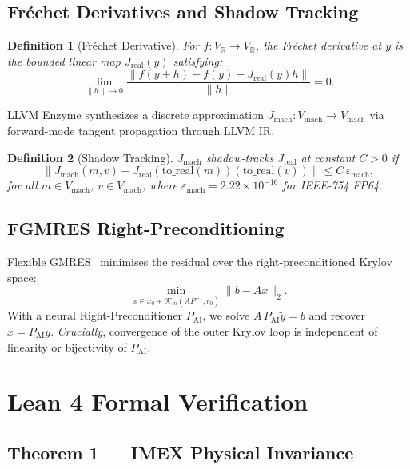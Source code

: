 \documentclass[11pt,twocolumn]{article}
\newtheorem{definition}{Definition}[section]
\begin{document}
\subsection{Fréchet Derivatives and Shadow Tracking}

\begin{definition}[Fréchet Derivative]
For $f: V_{\mathbb{R}} \to V_{\mathbb{R}}$, the Fréchet derivative at
$y$ is the bounded linear map $J_{\mathrm{real}}(y)$ satisfying:
\[
  \lim_{\|h\|\to 0}
  \frac{\|f(y+h)-f(y)-J_{\mathrm{real}}(y)h\|}{\|h\|} = 0.
\]
\end{definition}

LLVM Enzyme synthesizes a discrete approximation
$J_{\mathrm{mach}}: V_{\mathrm{mach}}\to V_{\mathrm{mach}}$
via forward-mode tangent propagation through LLVM IR.

\begin{definition}[Shadow Tracking]
$J_{\mathrm{mach}}$ \emph{shadow-tracks} $J_{\mathrm{real}}$ at constant
$C > 0$ if
\[
  \|J_{\mathrm{mach}}(m,v)
    - J_{\mathrm{real}}(\mathrm{to\_real}(m))(\mathrm{to\_real}(v))\|
  \leq C\,\varepsilon_{\mathrm{mach}},
\]
for all $m \in V_{\mathrm{mach}}$, $v \in V_{\mathrm{mach}}$, where
$\varepsilon_{\mathrm{mach}} = 2.22\times10^{-16}$ for IEEE-754 FP64.
\end{definition}

\subsection{FGMRES Right-Preconditioning}

Flexible GMRES~\cite{saad1993} minimises the residual over the
right-preconditioned Krylov space:
\[
  \min_{x \in x_0+\mathcal{K}_m(AP^{-1},r_0)} \|b - Ax\|_2.
\]
With a neural Right-Preconditioner $P_{\mathrm{AI}}$, we solve
$A\,P_{\mathrm{AI}}\tilde{y}=b$ and recover $x = P_{\mathrm{AI}}\tilde{y}$.
\emph{Crucially}, convergence of the outer Krylov loop is independent
of linearity or bijectivity of $P_{\mathrm{AI}}$.

\section{Lean 4 Formal Verification}
\label{sec:lean}

\subsection{Theorem 1 — IMEX Physical Invariance}
\end{document}
